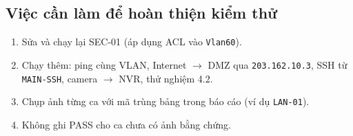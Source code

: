 \subsection{Việc cần làm để hoàn thiện kiểm thử}
\begin{enumerate}[noitemsep,topsep=2pt]
    \item Sửa và chạy lại SEC-01 (áp dụng ACL vào \texttt{Vlan60}).
    \item Chạy thêm: ping cùng VLAN, Internet $\to$ DMZ qua \texttt{203.162.10.3}, SSH từ \texttt{MAIN-SSH}, camera $\to$ NVR, thử nghiệm 4.2.
    \item Chụp ảnh từng ca với mã trùng bảng trong báo cáo (ví dụ \texttt{LAN-01}).
    \item Không ghi PASS cho ca chưa có ảnh bằng chứng.
\end{enumerate}
